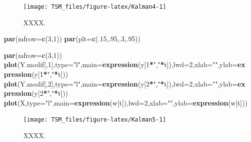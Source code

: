 \documentclass[
  12pt,
]{book}
\newenvironment{Shaded}{\begin{snugshade}}{\end{snugshade}}
\newcommand{\AttributeTok}[1]{\textcolor[rgb]{0.13,0.29,0.53}{#1}}
\newcommand{\DecValTok}[1]{\textcolor[rgb]{0.00,0.00,0.81}{#1}}
\newcommand{\FunctionTok}[1]{\textcolor[rgb]{0.13,0.29,0.53}{\textbf{#1}}}
\newcommand{\NormalTok}[1]{#1}
\newcommand{\SpecialCharTok}[1]{\textcolor[rgb]{0.81,0.36,0.00}{\textbf{#1}}}
\newcommand{\StringTok}[1]{\textcolor[rgb]{0.31,0.60,0.02}{#1}}
\theoremstyle{definition}
\theoremstyle{definition}
\theoremstyle{definition}
\theoremstyle{definition}
\theoremstyle{remark}
\begin{document}
\begin{figure}
\texttt{[image: TSM\_files/figure-latex/Kalman4-1]} \caption{XXXX.}\label{fig:Kalman4}
\end{figure}

\begin{Shaded}
\begin{Highlighting}[]
\FunctionTok{par}\NormalTok{(}\AttributeTok{mfrow=}\FunctionTok{c}\NormalTok{(}\DecValTok{3}\NormalTok{,}\DecValTok{1}\NormalTok{))}
\FunctionTok{par}\NormalTok{(}\AttributeTok{plt=}\FunctionTok{c}\NormalTok{(.}\DecValTok{15}\NormalTok{,.}\DecValTok{95}\NormalTok{,.}\DecValTok{3}\NormalTok{,.}\DecValTok{95}\NormalTok{))}

\FunctionTok{par}\NormalTok{(}\AttributeTok{mfrow=}\FunctionTok{c}\NormalTok{(}\DecValTok{3}\NormalTok{,}\DecValTok{1}\NormalTok{))}
\FunctionTok{plot}\NormalTok{(Y.modif[,}\DecValTok{1}\NormalTok{],}\AttributeTok{type=}\StringTok{"l"}\NormalTok{,}\AttributeTok{main=}\FunctionTok{expression}\NormalTok{(y[}\DecValTok{1}\SpecialCharTok{*}\StringTok{","}\SpecialCharTok{*}\NormalTok{t]),}\AttributeTok{lwd=}\DecValTok{2}\NormalTok{,}\AttributeTok{xlab=}\StringTok{""}\NormalTok{,}\AttributeTok{ylab=}\FunctionTok{expression}\NormalTok{(y[}\DecValTok{1}\SpecialCharTok{*}\StringTok{","}\SpecialCharTok{*}\NormalTok{t]))}
\FunctionTok{plot}\NormalTok{(Y.modif[,}\DecValTok{2}\NormalTok{],}\AttributeTok{type=}\StringTok{"l"}\NormalTok{,}\AttributeTok{main=}\FunctionTok{expression}\NormalTok{(y[}\DecValTok{2}\SpecialCharTok{*}\StringTok{","}\SpecialCharTok{*}\NormalTok{t]),}\AttributeTok{lwd=}\DecValTok{2}\NormalTok{,}\AttributeTok{xlab=}\StringTok{""}\NormalTok{,}\AttributeTok{ylab=}\FunctionTok{expression}\NormalTok{(y[}\DecValTok{2}\SpecialCharTok{*}\StringTok{","}\SpecialCharTok{*}\NormalTok{t]))}
\FunctionTok{plot}\NormalTok{(X,}\AttributeTok{type=}\StringTok{"l"}\NormalTok{,}\AttributeTok{main=}\FunctionTok{expression}\NormalTok{(w[t]),}\AttributeTok{lwd=}\DecValTok{2}\NormalTok{,}\AttributeTok{xlab=}\StringTok{""}\NormalTok{,}\AttributeTok{ylab=}\FunctionTok{expression}\NormalTok{(w[t]))}
\end{Highlighting}
\end{Shaded}

\begin{figure}
\texttt{[image: TSM\_files/figure-latex/Kalman5-1]} \caption{XXXX.}\label{fig:Kalman5}
\end{figure}
\end{document}
